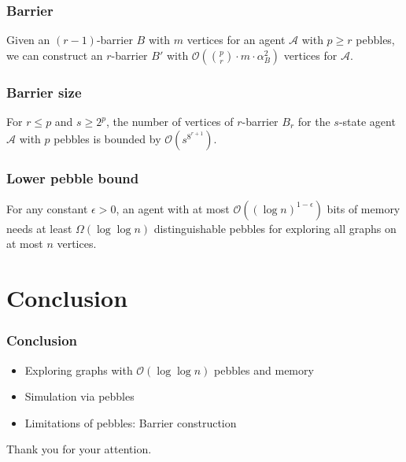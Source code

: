 \documentclass{beamer}
\begin{document}
\begin{frame}
  \frametitle{Barrier}
  \begin{theorem}
    Given an $(r-1)$-barrier $B$ with $m$ vertices for an agent $\mathcal{A}$
    with $p\geq r$ pebbles, we can construct an $r$-barrier $B'$ with
    $\mathcal{O}(\binom{p}{r}\cdot m\cdot\alpha_{B}^{2})$ vertices for
    $\mathcal{A}$.
  \end{theorem}
  \begin{center}
    \resizebox{0.7\textwidth}{!}{}
  \end{center}
\end{frame}

\begin{frame}
  \frametitle{Barrier size}
  \begin{center}
    \resizebox{\textwidth}{!}{}
  \end{center}
  \begin{theorem}
    For $r\leq p$ and $s\geq 2^{p}$, the number of vertices of $r$-barrier
    $B_{r}$ for the $s$-state agent $\mathcal{A}$ with $p$ pebbles is bounded
    by $\mathcal{O}(s^{8^{r+1}})$.
  \end{theorem}
\end{frame}

\begin{frame}
  \frametitle{Lower pebble bound}
  \begin{theorem}
    For any constant $\epsilon > 0$, an agent with at most
    $\mathcal{O}((\log n)^{1-\epsilon})$ bits of memory needs at least
    $\Omega(\log\log n)$ distinguishable pebbles for exploring all
    graphs on at most $n$ vertices.
  \end{theorem}
\end{frame}

\section{Conclusion}
\begin{frame}
  \frametitle{Conclusion}
  \begin{itemize}
    \item Exploring graphs with $\mathcal{O}(\log\log n)$ pebbles and memory
    \item Simulation via pebbles
    \item Limitations of pebbles: Barrier construction
  \end{itemize}
\end{frame}

\begin{frame}
  \begin{center}
    \Huge Thank you for your attention.
  \end{center}
\end{frame}
\end{document}

